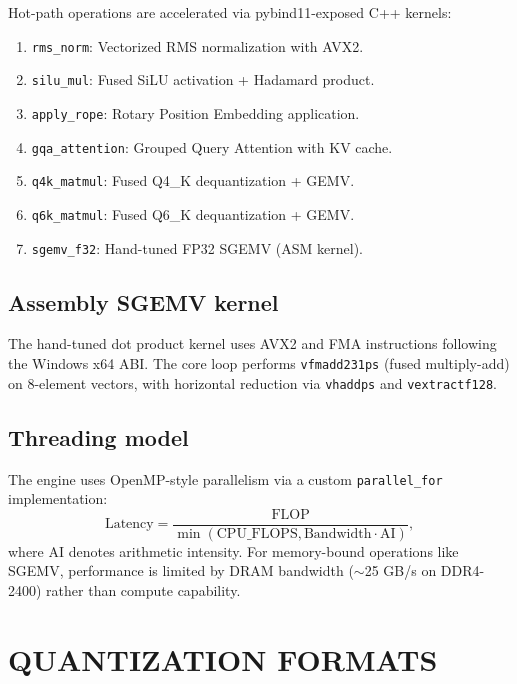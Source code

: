 \documentclass[aip,twocolumn,letterpaper]{revtex4}
\begin{document}
Hot-path operations are accelerated via pybind11-exposed C++ kernels:
\begin{enumerate}
\item \texttt{rms\_norm}: Vectorized RMS normalization with AVX2.
\item \texttt{silu\_mul}: Fused SiLU activation + Hadamard product.
\item \texttt{apply\_rope}: Rotary Position Embedding application.
\item \texttt{gqa\_attention}: Grouped Query Attention with KV cache.
\item \texttt{q4k\_matmul}: Fused Q4\_K dequantization + GEMV.
\item \texttt{q6k\_matmul}: Fused Q6\_K dequantization + GEMV.
\item \texttt{sgemv\_f32}: Hand-tuned FP32 SGEMV (ASM kernel).
\end{enumerate}

\subsection{Assembly SGEMV kernel}

The hand-tuned dot product kernel uses AVX2 and FMA instructions following the Windows x64 ABI. The core loop performs \texttt{vfmadd231ps} (fused multiply-add) on 8-element vectors, with horizontal reduction via \texttt{vhaddps} and \texttt{vextractf128}.

\subsection{Threading model}

The engine uses OpenMP-style parallelism via a custom \texttt{parallel\_for} implementation:
\begin{equation}
\mathrm{Latency} = \frac{\mathrm{FLOP}}{\min(\mathrm{CPU\_FLOPS}, \mathrm{Bandwidth} \cdot \mathrm{AI})},
\label{eq:roofline}
\end{equation}
where AI denotes arithmetic intensity. For memory-bound operations like SGEMV, performance is limited by DRAM bandwidth (\(\sim\)25 GB/s on DDR4-2400) rather than compute capability.

\section{QUANTIZATION FORMATS}
\end{document}
